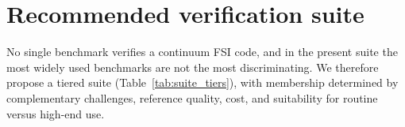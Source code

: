 \section{Recommended verification suite}\label{sec:recommended_suite}


No single benchmark verifies a continuum FSI code, and in the present suite the most widely used benchmarks are not the most discriminating.
We therefore propose a tiered suite (Table~\ref{tab:suite_tiers}), with membership determined by complementary challenges, reference quality, cost, and suitability for routine versus high-end use.

